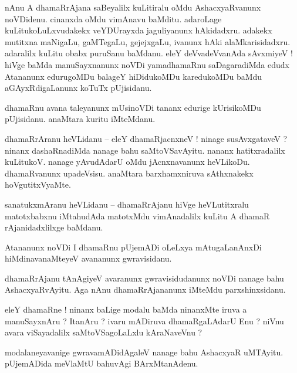 \documentclass{article}
\begin{document}
\begin{mn}%
nAnu A dhamaRrAjana saBeyalilx kuLitiralu oMdu AshacxyaRvanunx noVDidenu. cinanxda oMdu vimAnavu 
baMditu. adaroLage kuLitukoLuLxvudakekx veYDUrayxda jaguliyanunx hAkidadxru. adakekx mutitxna 
maNigaLu, gaMTegaLu, gejejxgaLu, ivanunx hAki alaMkarisidadxru. adaralilx kuLitu obabx puruSanu 
baMdanu. eleY deVvadeVvanAda sAvxmiyeV ! hiVge baMda manuSayxnanunx noVDi yamadhamaRnu 
saDagaradiMda edudx Atananunx edurugoMDu balageY hiDidukoMDu karedukoMDu baMdu aGAyxRdigaLanunx 
koTuTx pUjisidanu.
\end{mn}

\begin{mn}%
dhamaRnu avana taleyanunx mUsinoVDi tananx edurige kUrisikoMDu pUjisidanu. anaMtara kuritu iMteMdanu.
\end{mn}

\begin{mn}%
dhamaRrAranu heVLidanu -- eleY dhamaRjacnxneV ! ninage susAvxgataveV ? ninanx  dashaRnadiMda nanage 
bahu saMtoVSavAyitu. nananx hatitxradalilx kuLitukoV. nanage yAvudAdarU oMdu jAcnxnavanunx 
heVLikoDu. dhamaRvanunx upadeVsisu. anaMtara barxhamxniruva sAthxnakekx hoVgutitxVyaMte.
\end{mn}

\begin{mn}%
sanatukxmAranu heVLidanu -- dhamaRrAjanu hiVge heVLutitxralu matotxbabxnu iMtahudAda matotxMdu 
vimAnadalilx kuLitu A dhamaR rAjanidadxlilxge baMdanu.
\end{mn}

\begin{mn}%
Atananunx noVDi I dhamaRnu pUjemADi oLeLxya mAtugaLanAnxDi hiMdinavanaMteyeV avananunx gwravisidanu.
\end{mn}

\begin{mn}%
dhamaRrAjanu tAnAgiyeV avaranunx gwravisidudanunx noVDi nanage bahu AshacxyaRvAyitu. Aga nAnu 
dhamaRrAjananunx iMteMdu parxshinxsidanu.
\end{mn}

\begin{mn}%
eleY dhamaRne ! ninanx baLige modalu baMda ninanxMte iruva a manuSayxnAru ? ItanAru ? ivaru mADiruva 
dhamaRgaLAdarU Enu ? niVnu avara viSayadalilx saMtoVSagoLaLxlu kAraNaveVnu ?
\end{mn}

\begin{mn}%
modalaneyavanige gwravamADidAgaleV nanage bahu AshacxyaR uMTAyitu. pUjemADida meVlaMtU bahuvAgi 
BArxMtanAdenu.
\end{mn}
\end{document}
